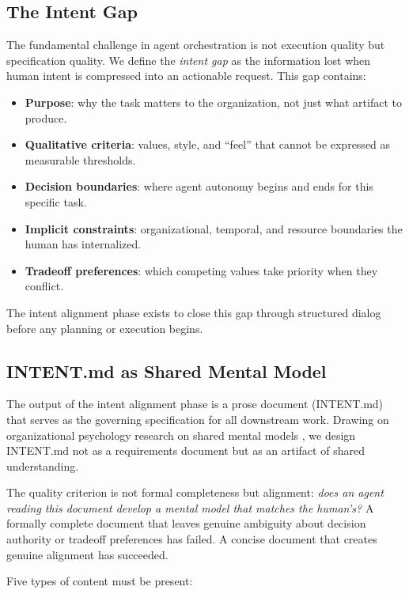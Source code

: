 \documentclass[11pt,a4paper]{article}
\begin{document}
\subsection{The Intent Gap}

The fundamental challenge in agent orchestration is not execution quality
but specification quality. We define the \emph{intent gap} as the
information lost when human intent is compressed into an actionable
request. This gap contains:

\begin{itemize}
    \item \textbf{Purpose}: why the task matters to the organization,
    not just what artifact to produce.
    \item \textbf{Qualitative criteria}: values, style, and ``feel''
    that cannot be expressed as measurable thresholds.
    \item \textbf{Decision boundaries}: where agent autonomy begins
    and ends for this specific task.
    \item \textbf{Implicit constraints}: organizational, temporal, and
    resource boundaries the human has internalized.
    \item \textbf{Tradeoff preferences}: which competing values take
    priority when they conflict.
\end{itemize}

The intent alignment phase exists to close this gap through structured
dialog before any planning or execution begins.

\subsection{INTENT.md as Shared Mental Model}

The output of the intent alignment phase is a prose document
(INTENT.md) that serves as the governing specification for all
downstream work. Drawing on organizational psychology research on
shared mental models \citep{cannon2001work}, we design INTENT.md not
as a requirements document but as an artifact of shared understanding.

The quality criterion is not formal completeness but alignment:
\emph{does an agent reading this document develop a mental model
that matches the human's?} A formally complete document that leaves
genuine ambiguity about decision authority or tradeoff preferences
has failed. A concise document that creates genuine alignment has
succeeded.

Five types of content must be present:
\end{document}
